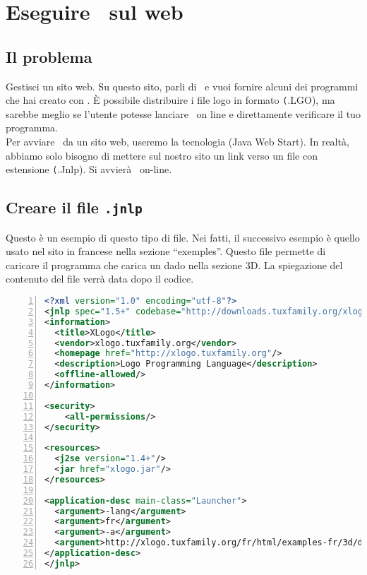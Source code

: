 \chapter{Eseguire \xlogo\ sul web}
\section{Il problema}

Gestisci un sito web. Su questo sito, parli di \xlogo\ e vuoi fornire alcuni dei programmi che hai creato con \xlogo. È possibile distribuire i file logo in formato \texttt (.LGO), ma sarebbe meglio se l'utente potesse lanciare \xlogo\ on line e direttamente verificare il tuo programma.\\

Per avviare \xlogo\ da un sito web, useremo la tecnologia \textsc(Java Web Start). In realtà, abbiamo solo bisogno di mettere sul nostro sito un link verso un file con estensione \texttt(.Jnlp). Si avvierà \xlogo\ on-line.

\section{Creare il file \texttt{.jnlp}}
Questo è un esempio di questo tipo di file. Nei fatti, il successivo esempio è quello usato nel sito in francese nella sezione ``exemples''. Questo file permette di caricare il programma che carica un dado nella sezione 3D. La spiegazione del contenuto del file verrà data dopo il codice.

\begin{lstlisting}[language=XML, numbers=left, numberstyle=\tiny]
 <?xml version="1.0" encoding="utf-8"?>
<jnlp spec="1.5+" codebase="http://downloads.tuxfamily.org/xlogo/common/webstart">
<information>
  <title>XLogo</title>
  <vendor>xlogo.tuxfamily.org</vendor>
  <homepage href="http://xlogo.tuxfamily.org"/>
  <description>Logo Programming Language</description>
  <offline-allowed/>
</information>

<security>
	<all-permissions/>
</security>

<resources>
  <j2se version="1.4+"/>
  <jar href="xlogo.jar"/>
</resources>

<application-desc main-class="Launcher">
  <argument>-lang</argument>
  <argument>fr</argument>
  <argument>-a</argument>
  <argument>http://xlogo.tuxfamily.org/fr/html/examples-fr/3d/de.lgo</argument>
</application-desc>
</jnlp>

\end{lstlisting}

